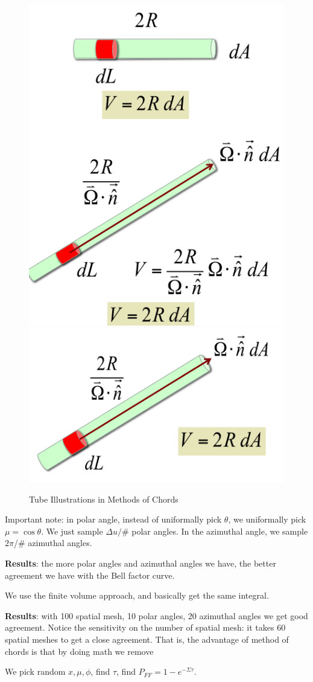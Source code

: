 \documentclass{school-22.211-notes}
\begin{document}
\begin{figure}[h]
  \centering
  \includegraphics[width=0.45\linewidth]{images/pin/inf-plane-5.png}
  \includegraphics[width=0.45\linewidth]{images/pin/inf-plane-6.png}
  \caption{Tube Illustrations in Methods of Chords} \label{inf-plane-3}
\end{figure}



Important note: in polar angle, instead of uniformally pick $\theta$, we uniformally pick $\mu = \cos \theta$. We just sample $\Delta u /$\# polar angles. In the azimuthal angle, we sample $2\pi$/\# azimuthal angles. 


\textbf{Results}: the more polar angles and azimuthal angles we have, the better agreement we have with the Bell factor curve. 




\clearpage
{}
We use the finite volume approach, and basically get the same integral. 

\textbf{Results}: with 100 spatial mesh, 10 polar angles, 20 azimuthal angles we get good agreement. Notice the sensitivity on the number of spatial mesh: it takes 60 spatial meshes to get a close agreement. That is, the advantage of method of chords is that by doing math we remove 


\clearpage
{}
We pick random $x, \mu, \phi$, find $\tau$, find $P_{FF} = 1 - e^{-\Sigma \tau}$. 
\end{document}
